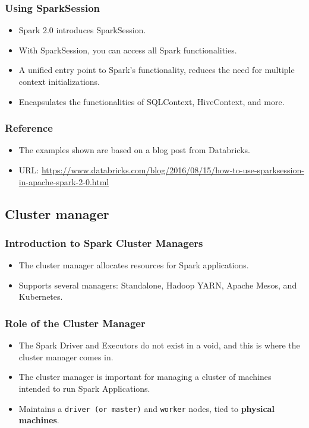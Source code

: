 \begin{frame}
    \frametitle{Using SparkSession}

    \begin{itemize}

        \item Spark 2.0 introduces SparkSession.
        \item With SparkSession, you can access all Spark functionalities.
        \item A unified entry point to Spark's functionality, reduces the need for multiple context initializations.
        \item Encapsulates the functionalities of SQLContext, HiveContext, and more.
    \end{itemize}

\end{frame}

\begin{frame}
    \frametitle{Reference}

    \begin{itemize}
        \item The examples shown are based on a blog post from Databricks.
        \item URL: \url{https://www.databricks.com/blog/2016/08/15/how-to-use-sparksession-in-apache-spark-2-0.html}
    \end{itemize}

\end{frame}


\subsection{Cluster manager}\label{subsec:cluster-manager}

\begin{frame}
    \frametitle{Introduction to Spark Cluster Managers}
    \begin{itemize}
        \item The cluster manager allocates resources for Spark applications.
        \item Supports several managers: Standalone, Hadoop YARN, Apache Mesos, and Kubernetes.
    \end{itemize}
\end{frame}

\begin{frame}
    \frametitle{Role of the Cluster Manager}
    \begin{itemize}
        \item The Spark Driver and Executors do not exist in a void, and this is where the cluster manager
        comes in.
        \item The cluster manager is important for managing a cluster of machines intended to run Spark Applications.
        \item Maintains a \texttt{driver (or master)} and \texttt{worker} nodes, tied to \textbf{physical machines}.
    \end{itemize}
\end{frame}


